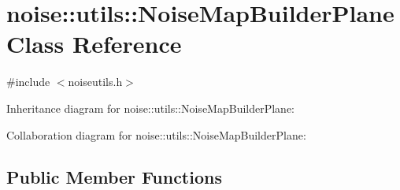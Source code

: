 \hypertarget{classnoise_1_1utils_1_1_noise_map_builder_plane}{\section{noise\+:\+:utils\+:\+:Noise\+Map\+Builder\+Plane Class Reference}
\label{classnoise_1_1utils_1_1_noise_map_builder_plane}
}


{\ttfamily \#include $<$noiseutils.\+h$>$}



Inheritance diagram for noise\+:\+:utils\+:\+:Noise\+Map\+Builder\+Plane\+:


Collaboration diagram for noise\+:\+:utils\+:\+:Noise\+Map\+Builder\+Plane\+:
\subsection*{Public Member Functions}
